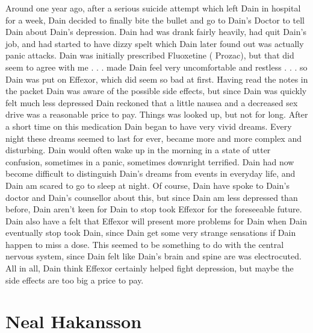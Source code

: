 \documentclass[12pt]{book}
\begin{document}
Around one year ago, after a serious suicide attempt which left Dain in hospital for a week, Dain decided to finally bite the bullet and go to Dain's Doctor to tell Dain about Dain's depression. Dain had was drank fairly heavily, had quit Dain's job, and had started to have dizzy spelt which Dain later found out was actually panic attacks. Dain was initially prescribed Fluoxetine ( Prozac), but that did seem to agree with me . . .  made Dain feel very uncomfortable and restless . . .  so Dain was put on Effexor, which did seem so bad at first. Having read the notes in the packet Dain was aware of the possible side effects, but since Dain was quickly felt much less depressed Dain reckoned that a little nausea and a decreased sex drive was a reasonable price to pay. Things was looked up, but not for long. After a short time on this medication Dain began to have very vivid dreams. Every night these dreams seemed to last for ever, became more and more complex and disturbing. Dain would often wake up in the morning in a state of utter confusion, sometimes in a panic, sometimes downright terrified. Dain had now become difficult to distinguish Dain's dreams from events in everyday life, and Dain am scared to go to sleep at night. Of course, Dain have spoke to Dain's doctor and Dain's counsellor about this, but since Dain am less depressed than before, Dain aren't keen for Dain to stop took Effexor for the foreseeable future. Dain also have a felt that Effexor will present more problems for Dain when Dain eventually stop took Dain, since Dain get some very strange sensations if Dain happen to miss a dose. This seemed to be something to do with the central nervous system, since Dain felt like Dain's brain and spine are was electrocuted. All in all, Dain think Effexor certainly helped fight depression, but maybe the side effects are too big a price to pay.



\chapter{Neal Hakansson}
\end{document}
